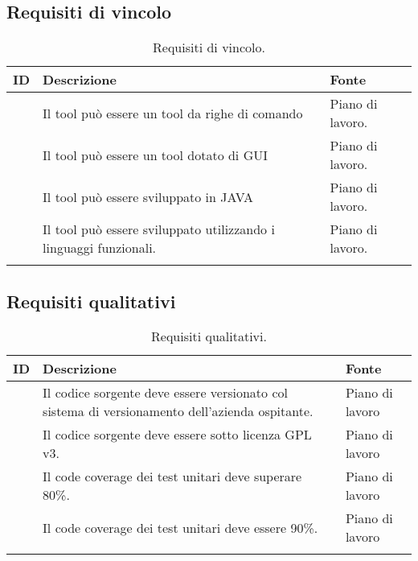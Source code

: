 \subsection{Requisiti di vincolo}\label{subsec:requisiti-vincolo}
\begin{center}
    \begin{longtable}{ | c| C{7cm} |C{3cm} |}
        \hline
        \textbf{ID} & \textbf{Descrizione}                                              & \textbf{Fonte}   \\\hline
               & Il tool può essere un tool da righe di comando                    & Piano di lavoro. \\\hline
               & Il tool può essere un tool dotato di GUI                          & Piano di lavoro. \\\hline
               & Il tool può essere sviluppato in JAVA                             & Piano di lavoro. \\\hline
               & Il tool può essere sviluppato utilizzando i linguaggi funzionali. & Piano di lavoro. \\\hline
        \caption{Requisiti di vincolo.}
    \end{longtable}
\end{center}
\setcounter{rowcount}{0}

\subsection{Requisiti qualitativi}\label{subsec:requisiti-qualitativi}
\begin{center}
    \begin{longtable}{ | c| C{7cm} |C{3cm} |}
        \hline
        \textbf{ID} & \textbf{Descrizione}                                                                           & \textbf{Fonte}  \\\hline
               & Il codice sorgente deve essere versionato col sistema di versionamento dell'azienda ospitante. & Piano di lavoro \\\hline
               & Il codice sorgente deve essere sotto licenza GPL v3.                                           & Piano di lavoro \\\hline
               & Il code coverage dei test unitari deve superare 80\%.                                          & Piano di lavoro \\\hline
               & Il code coverage dei test unitari deve essere 90\%.                                           & Piano di lavoro \\\hline
        \caption{Requisiti qualitativi.}
    \end{longtable}
\end{center}
\setcounter{subCount}{0}
\setcounter{rowcount}{0}